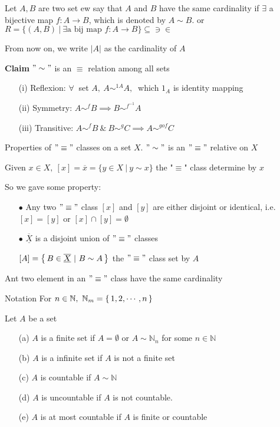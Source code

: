\begin{defn}[cardinality]
	Let $A,B$ are two set ew say that $A$ and $B$ have the same cardinality if $\exists$ a bijective map $f:A \rightarrow B$, which is denoted by $A \sim B$. or $R = \{(A,B)~|~\exists \text{a bij map }f: A \rightarrow B\} \subseteq \ni\in$
	
	From now on, we write $|A|$ as the cardinality of $A$
\end{defn}

\textbf{Claim} $"\sim"$ is an $\equiv$ relation among all sets

\begin{enumerate}
	\item[(i)] Reflexion: $\forall~$ set $A,~A\sim^{1A} A,~$ which $1_A$ is identity mapping
	\item[(ii)] Symmetry: $A \sim^{f}B \implies B\sim^{f^{-1}} A$
	\item[(iii)] Transitive: $A \sim^{f} B ~\&~ B\sim^{g}C \implies A \sim^{g o f}C$
\end{enumerate}

Properties of $"\equiv"$ classes on a set $X$. $"\sim"$ is an $"\equiv"$ relative on $X$

Given $x \in X,~[x] = \overline{x} = \{y \in X~|~y \sim x\}$ the "$\equiv$" class determine by $x$

So we gave some property:

\begin{enumerate}
	\item[$\bullet$] Any two $"\equiv"$ class $[x]$ and $[y]$ are either disjoint or identical, i.e. $[x] = [y]$ or $[x] \cap [y] = \emptyset$
	\item[$\bullet$] $\overline{\underline{X}}$ is a disjoint union of $"\equiv "$ classes
	
	$[A] = \left\{ \,B \in \overline{\underline{X}}~|~B \sim A \,\right\}$ the $"\equiv "$ class set by $A$
\end{enumerate}

Ant two element in an $"\equiv "$ class have the same cardinality

Notation For $n \in \mathbb N,~\mathbb N_{m} = \left\{ \,1,2,\cdots,n \,\right\}$

\begin{defn}
	Let $A$ be a set
	
	\begin{enumerate}
		\item[(a)] $A$ is a finite set if $A = \emptyset$ or $A \sim \mathbb N_n$ for some $n \in \mathbb N$
		\item[(b)] $A$ is a infinite set if $A$ is not a finite set 
		\item[(c)] $A$ is countable if $A \sim \mathbb N$
		\item[(d)] $A$ is uncountable if $A$ is not countable.
		\item[(e)] $A$ is at most countable if $A$ is finite or countable
	\end{enumerate}
\end{defn}

